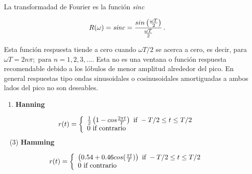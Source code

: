 \documentclass[
]{agujournal2019}
\providecommand{\tightlist}{%
  \setlength{\itemsep}{0pt}\setlength{\parskip}{0pt}}\usepackage{longtable,booktabs,array}
\begin{document}
\begin{center}
\end{center}

La transformadad de Fourier es la función \emph{sinc}

\[R(\omega)={\it sinc}=\frac{sin\left(\frac{\omega T}{2}\right)}{\frac{\omega T}{2}}\,.\]

\begin{center}
\end{center}

Esta función respuesta tiende a cero cuando \(\omega T / 2\) se acerca a
cero, es decir, para
\(\omega T=2 n \pi;\,\,\text{para}\,\,n=1,2,3,...\). Esta no es una
ventana o función respuesta recomendable debido a los lóbulos de menor
amplitud alrededor del pico. En general respuestas tipo ondas
sinusoidales o cosinusoidales amortiguadas a ambos lados del pico no son
deseables.

\vspace{0.75cm}

\begin{enumerate}
\def\labelenumi{(\arabic{enumi})}
\setcounter{enumi}{1}
\tightlist
\item
  \textbf{Hanning}
\end{enumerate}

\begin{equation*}
  r(t)=\left\lbrace
  \begin{array}{l}
     \frac{1}{2}\left( 1-cos\frac{2\pi t}{T}\right)
      \text{ if } -T/2 \le t \le T/2 \\
     0 \text{ if } {\rm contrario} \\
  \end{array}
  \right.
  \end{equation*} ~ (3) \textbf{Hamming}

\begin{equation*}
  r(t)=\left\lbrace
  \begin{array}{l}
     \left(0.54  + 0.46 cos(\frac{\pi t}{T}) \right) \text{ if } -T/2 \le t \le T/2 \\
     0 \text{ if } {\rm contrario} \\
  \end{array}
  \right.
  \end{equation*}

\begin{center}
\end{center}
\end{document}
